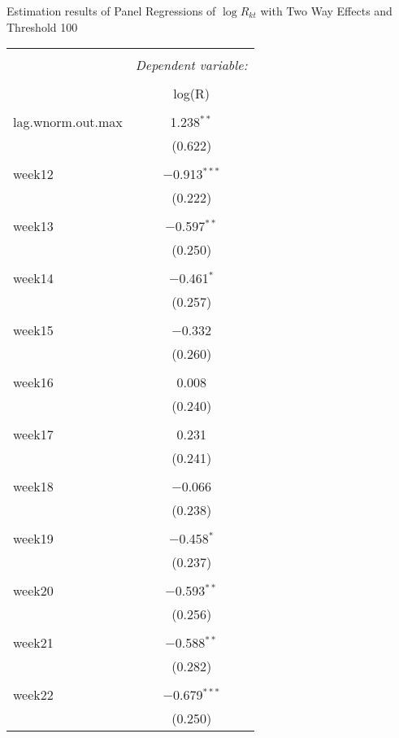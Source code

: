   \caption{Estimation results of Panel Regressions of $\log R_{kt}$ with Two Way Effects and Threshold 100} 
  \label{} 
\small 
\begin{tabular}{@{\extracolsep{5pt}}lc} 
\\[-1.8ex]\hline 
\hline \\[-1.8ex] 
 & \multicolumn{1}{c}{\textit{Dependent variable:}} \\ 
\cline{2-2} 
\\[-1.8ex] & log(R) \\ 
\hline \\[-1.8ex] 
 lag.wnorm.out.max & 1.238$^{**}$ \\ 
  & (0.622) \\ 
  & \\ 
 week12 & $-$0.913$^{***}$ \\ 
  & (0.222) \\ 
  & \\ 
 week13 & $-$0.597$^{**}$ \\ 
  & (0.250) \\ 
  & \\ 
 week14 & $-$0.461$^{*}$ \\ 
  & (0.257) \\ 
  & \\ 
 week15 & $-$0.332 \\ 
  & (0.260) \\ 
  & \\ 
 week16 & 0.008 \\ 
  & (0.240) \\ 
  & \\ 
 week17 & 0.231 \\ 
  & (0.241) \\ 
  & \\ 
 week18 & $-$0.066 \\ 
  & (0.238) \\ 
  & \\ 
 week19 & $-$0.458$^{*}$ \\ 
  & (0.237) \\ 
  & \\ 
 week20 & $-$0.593$^{**}$ \\ 
  & (0.256) \\ 
  & \\ 
 week21 & $-$0.588$^{**}$ \\ 
  & (0.282) \\ 
  & \\ 
 week22 & $-$0.679$^{***}$ \\ 
  & (0.250) \\ 

\end{tabular}
